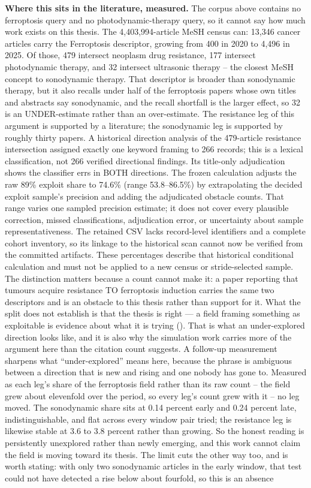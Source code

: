 \documentclass[11pt,twoside,openright]{report}
\begin{document}
\textbf{Where this sits in the literature, measured.} The corpus above contains no ferroptosis query and no photodynamic-therapy query, so it cannot say how much work exists on this thesis. The 4,403,994-article MeSH census can: 13,346 cancer articles carry the Ferroptosis descriptor, growing from 400 in 2020 to 4,496 in 2025. Of those, 479 intersect neoplasm drug resistance, 177 intersect photodynamic therapy, and 32 intersect ultrasonic therapy -- the closest MeSH concept to sonodynamic therapy. That descriptor is broader than sonodynamic therapy, but it also recalls under half of the ferroptosis papers whose own titles and abstracts say sonodynamic, and the recall shortfall is the larger effect, so 32 is an UNDER-estimate rather than an over-estimate. The resistance leg of this argument is supported by a literature; the sonodynamic leg is supported by roughly thirty papers. A historical direction analysis of the 479-article resistance intersection assigned exactly one keyword framing to 266 records; this is a lexical classification, not 266 verified directional findings. Its title-only adjudication shows the classifier errs in BOTH directions. The frozen calculation adjusts the raw 89\% exploit share to 74.6\% (range 53.8–86.5\%) by extrapolating the decided exploit sample's precision and adding the adjudicated obstacle counts. That range varies one sampled precision estimate; it does not cover every plausible correction, missed classifications, adjudication error, or uncertainty about sample representativeness. The retained CSV lacks record-level identifiers and a complete cohort inventory, so its linkage to the historical scan cannot now be verified from the committed artifacts. These percentages describe that historical conditional calculation and must not be applied to a new census or stride-selected sample. The distinction matters because a count cannot make it: a paper reporting that tumours acquire resistance TO ferroptosis induction carries the same two descriptors and is an obstacle to this thesis rather than support for it. What the split does not establish is that the thesis is right --- a field framing something as exploitable is evidence about what it is trying (). That is what an under-explored direction looks like, and it is also why the simulation work carries more of the argument here than the citation count suggests. A follow-up measurement sharpens what ``under-explored'' means here, because the phrase is ambiguous between a direction that is new and rising and one nobody has gone to. Measured as each leg's share of the ferroptosis field rather than its raw count -- the field grew about elevenfold over the period, so every leg's count grew with it -- no leg moved. The sonodynamic share sits at 0.14 percent early and 0.24 percent late, indistinguishable, and flat across every window pair tried; the resistance leg is likewise stable at 3.6 to 3.8 percent rather than growing. So the honest reading is persistently unexplored rather than newly emerging, and this work cannot claim the field is moving toward its thesis. The limit cuts the other way too, and is worth stating: with only two sonodynamic articles in the early window, that test could not have detected a rise below about fourfold, so this is an absence 
\end{document}
